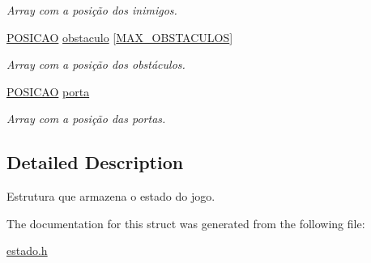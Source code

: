 \begin{DoxyCompactItemize}
\begin{DoxyCompactList}\small\item\em Array com a posição dos inimigos. \end{DoxyCompactList}\item 
\hyperlink{estado_8h_a55b3f4b56938eeb8fa5e8f9c07baf1b0}{P\+O\+S\+I\+C\+AO} \hyperlink{structestado_a970dc20c6687acb17c3f08c06edbed4f}{obstaculo} \mbox{[}\hyperlink{estado_8h_ac574e2817856ecc9a890d2d47cb9d783}{M\+A\+X\+\_\+\+O\+B\+S\+T\+A\+C\+U\+L\+OS}\mbox{]}\hypertarget{structestado_a970dc20c6687acb17c3f08c06edbed4f}{}\label{structestado_a970dc20c6687acb17c3f08c06edbed4f}

\begin{DoxyCompactList}\small\item\em Array com a posição dos obstáculos. \end{DoxyCompactList}\item 
\hyperlink{estado_8h_a55b3f4b56938eeb8fa5e8f9c07baf1b0}{P\+O\+S\+I\+C\+AO} \hyperlink{structestado_ab9d0effbcfe3e0db02a552a500e25999}{porta}\hypertarget{structestado_ab9d0effbcfe3e0db02a552a500e25999}{}\label{structestado_ab9d0effbcfe3e0db02a552a500e25999}

\begin{DoxyCompactList}\small\item\em Array com a posição das portas. \end{DoxyCompactList}\end{DoxyCompactItemize}


\subsection{Detailed Description}
Estrutura que armazena o estado do jogo. 

The documentation for this struct was generated from the following file\+:\begin{DoxyCompactItemize}
\item 
\hyperlink{estado_8h}{estado.\+h}\end{DoxyCompactItemize}
